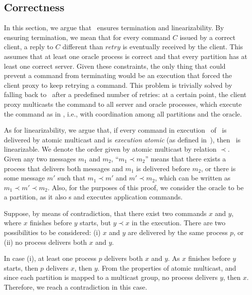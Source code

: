 \subsection{Correctness}
\label{sec:dssmr-correctness}

In this section, we argue that \dssmr\ ensures termination and linearizability.
By ensuring termination, we mean that for every command $C$ issued by a correct
client, a reply to $C$ different than $retry$ is eventually received by the
client. This assumes that at least one oracle process is correct and that every
partition has at least one correct server. Given these constraints, the only
thing that could prevent a command from terminating would be an execution that
forced the client proxy to keep retrying a command. This problem is trivially
solved by falling back to \ssmr\ after a predefined number of retries: at a
certain point, the client proxy multicasts the command to all server and oracle
processes, which execute the command as in \ssmr{}, i.e., with coordination
among all partitions and the oracle.

As for linearizability, we argue that, if every command in execution \ex\ of
\dssmr\ is delivered by atomic multicast and is \emph{execution atomic} (as
defined in~\cite{bezerra2014ssmr}), then \ex\ is linearizable. We denote the
order given by atomic multicast by relation $\prec$. Given any two messages
$m_1$ and $m_2$, ``$m_1 \prec m_2$'' means that there exists a process that
delivers both messages and $m_1$ is delivered before $m_2$, or there is some
message $m'$ such that $m_1 \prec m'$ and $m' \prec m_2$, which can be written
as \mbox{$m_1 \prec m' \prec m_2$}.
Also, for the purposes of this proof, we consider the oracle to be a partition,
as it also \amdel{}s and executes application commands.

Suppose, by means of contradiction, that there exist two commands $x$ and $y$,
where $x$ finishes before $y$ starts, but $y \prec x$ in the execution. There
are two possibilities to be considered: (i) $x$ and $y$ are delivered by the
same process $p$, or (ii) no process delivers both $x$ and $y$.

In case (i), at least one process $p$ delivers both $x$ and $y$. As $x$ finishes
before $y$ starts, then $p$ delivers $x$, then $y$. From the properties of
atomic multicast, and since each partition is mapped to a multicast group, no
process delivers $y$, then $x$. Therefore, we reach a contradiction in this
case.

